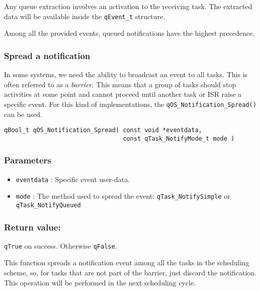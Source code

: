 

\begin{tcolorbox}
\HandRight Any queue extraction involves an activation to the receiving task. The extracted data will be available inside the \lstinline{qEvent_t} structure.
\end{tcolorbox}

\begin{tcolorbox}
\HandRight Among all the provided events, queued notifications have the highest precedence.
\end{tcolorbox}


\subsubsection{Spread a notification}
In some systems, we need the ability to broadcast an event to all tasks. This is often referred to as a \textit{barrier}. This means that a group of tasks should stop activities at some point and cannot proceed until another task or ISR raise a specific event. 
For this kind of implementations, the \lstinline{qOS_Notification_Spread()}  can be used. 
\medskip
\begin{lstlisting}[style=CStyle]
qBool_t qOS_Notification_Spread( const void *eventdata, 
                                 const qTask_NotifyMode_t mode )
\end{lstlisting}

\subsubsection*{Parameters}
\begin{itemize}
    \item \lstinline{eventdata} : Specific event user-data. 
    \item \lstinline{mode} : The method used to spread the event: \lstinline{qTask_NotifySimple} or \lstinline{qTask_NotifyQueued}
\end{itemize}

\subsubsection*{Return value:}

\lstinline{qTrue} on success. Otherwise \lstinline{qFalse}.

\noindent\hrulefill
\medskip

\begin{tcolorbox}
\HandRight This function spreads a notification event among all the tasks in the scheduling scheme, so,  for tasks that are not part of the barrier, just discard the notification. This operation will be performed in the next scheduling cycle.
\end{tcolorbox}

